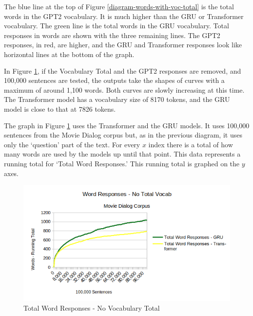 The blue line at the top of Figure \ref{diagram-words-with-voc-total} is the total words in the GPT2 vocabulary. It is much higher than the GRU or Transformer vocabulary.
The green line is the total words in the GRU vocabulary. Total responses in words are shown with the three remaining lines. The GPT2 responses, in red, are higher, and the GRU and Transformer responses look like horizontal lines at the bottom of the graph.

In Figure \ref{diagram-words-no-voc-total}, if the Vocabulary Total and the GPT2 responses are removed, and 100,000 sentences are tested, the outputs take the shapes of curves with a maximum of around 1,100 words. Both curves are slowly increasing at this time. The Transformer model has a vocabulary size of 8170 tokens, and the GRU model is close to that at 7826 tokens.

The graph in Figure \ref{diagram-words-no-voc-total} uses the Transformer and the GRU models. It uses 100,000 sentences from the Movie Dialog corpus but, as in the previous diagram, it uses only the `question' part of the text. For every $x$ index there is a total of how many words are used by the models up until that point. This data represents a running total for `Total Word Responses.' This running total is graphed on the $y$ axes. 

\begin{figure}[H]
	\begin{center}
		\includegraphics[scale=0.75]{diagram-100000-novocab}
		
		
	\end{center}
	\caption[Total Word Responses]{Total Word Responses - No Vocabulary Total}
	\label{diagram-words-no-voc-total}
	
\end{figure}


